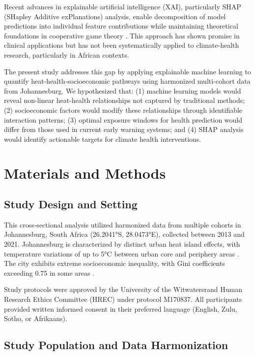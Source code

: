 \documentclass[11pt,a4paper]{article}
\begin{document}
Recent advances in explainable artificial intelligence (XAI), particularly SHAP (SHapley Additive exPlanations) analysis, enable decomposition of model predictions into individual feature contributions while maintaining theoretical foundations in cooperative game theory \citep{lundberg2017unified}. This approach has shown promise in clinical applications \citep{chen2020machine} but has not been systematically applied to climate-health research, particularly in African contexts.

The present study addresses this gap by applying explainable machine learning to quantify heat-health-socioeconomic pathways using harmonized multi-cohort data from Johannesburg. We hypothesized that: (1) machine learning models would reveal non-linear heat-health relationships not captured by traditional methods; (2) socioeconomic factors would modify these relationships through identifiable interaction patterns; (3) optimal exposure windows for health prediction would differ from those used in current early warning systems; and (4) SHAP analysis would identify actionable targets for climate health interventions.

\section{Materials and Methods}

\subsection{Study Design and Setting}

This cross-sectional analysis utilized harmonized data from multiple cohorts in Johannesburg, South Africa (26.2041°S, 28.0473°E), collected between 2013 and 2021. Johannesburg is characterized by distinct urban heat island effects, with temperature variations of up to 5°C between urban core and periphery areas \citep{jury2021johannesburg}. The city exhibits extreme socioeconomic inequality, with Gini coefficients exceeding 0.75 in some areas \citep{gcro2016quality}.

Study protocols were approved by the University of the Witwatersrand Human Research Ethics Committee (HREC) under protocol M170837. All participants provided written informed consent in their preferred language (English, Zulu, Sotho, or Afrikaans).

\subsection{Study Population and Data Harmonization}
\end{document}
